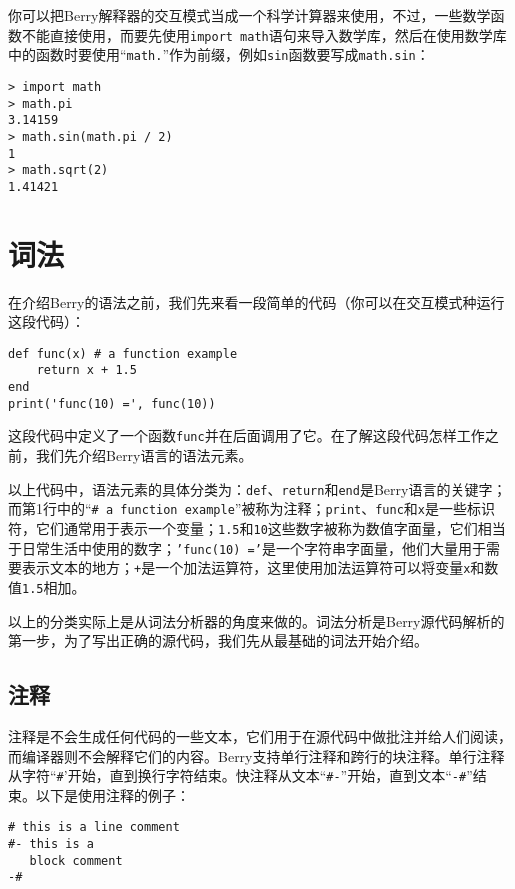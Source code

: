 你可以把Berry解释器的交互模式当成一个科学计算器来使用，不过，一些数学函数不能直接使用，而要先使用\texttt{import math}语句来导入数学库，然后在使用数学库中的函数时要使用``\texttt{math.}''作为前缀，例如\texttt{sin}函数要写成\texttt{math.sin}：
\begin{lstlisting}[language=berry, numbers=none]
> import math
> math.pi
3.14159
> math.sin(math.pi / 2)
1
> math.sqrt(2)
1.41421
\end{lstlisting}

\section{词法}

在介绍Berry的语法之前，我们先来看一段简单的代码（你可以在交互模式种运行这段代码）：
\begin{lstlisting}[language=berry]
def func(x) # a function example
    return x + 1.5
end
print('func(10) =', func(10))
\end{lstlisting}

这段代码中定义了一个函数\texttt{func}并在后面调用了它。在了解这段代码怎样工作之前，我们先介绍Berry语言的语法元素。

以上代码中，语法元素的具体分类为：\texttt{def}、\texttt{return}和\texttt{end}是Berry语言的关键字；而第1行中的``\texttt{\# a function example}''被称为注释；\texttt{print}、\texttt{func}和\texttt{x}是一些标识符，它们通常用于表示一个变量；\texttt{1.5}和\texttt{10}这些数字被称为数值字面量，它们相当于日常生活中使用的数字；\texttt{'func(10) ='}是一个字符串字面量，他们大量用于需要表示文本的地方；\texttt{+}是一个加法运算符，这里使用加法运算符可以将变量\texttt{x}和数值\texttt{1.5}相加。

以上的分类实际上是从词法分析器的角度来做的。词法分析是Berry源代码解析的第一步，为了写出正确的源代码，我们先从最基础的词法开始介绍。

\subsection{注释}

注释是不会生成任何代码的一些文本，它们用于在源代码中做批注并给人们阅读，而编译器则不会解释它们的内容。Berry支持单行注释和跨行的块注释。单行注释从字符``\texttt{\#}'开始，直到换行字符结束。快注释从文本``\texttt{\#-}''开始，直到文本``\texttt{-\#}''结束。以下是使用注释的例子：
\begin{lstlisting}[language=berry, numbers=none]
# this is a line comment
#- this is a
   block comment
-#
\end{lstlisting}

